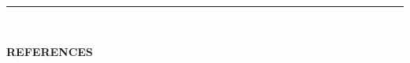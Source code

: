 \documentclass[12pt, b4paper]{cv}
\begin{document}
\vspace{-0.15in}
\rule{\textwidth}{1pt}\\
\vspace{-0.15in}







{\Large \textbf{REFERENCES}}
\end{document}
